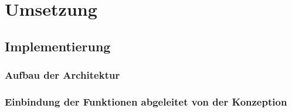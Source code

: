 \chapter{Umsetzung}
\label{chap:umsetzung}
\section{Implementierung}
\subsection{Aufbau der Architektur}
\subsection{Einbindung der Funktionen abgeleitet von der Konzeption}